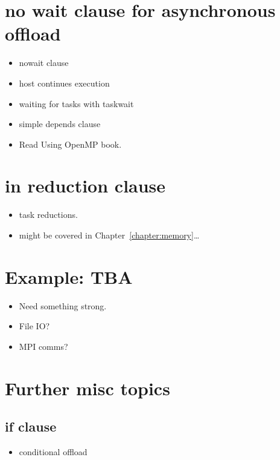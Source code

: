 \section{no wait clause for asynchronous offload}
\begin{itemize}
  \item nowait clause
  \item host continues execution
  \item waiting for tasks with taskwait
  \item simple depends clause
  \item Read Using OpenMP book.
\end{itemize}

\section{in reduction clause}
\label{sec:in_reduction}
\begin{itemize}
  \item task reductions.
  \item might be covered in Chapter~\ref{chapter:memory}\dots
\end{itemize}


\section{Example: TBA}
\begin{itemize}
  \item Need something strong.
  \item File IO?
  \item MPI comms?
\end{itemize}



\section{Further misc topics}
\subsection{if clause}
\label{sec:if_clause}
\begin{itemize}
  \item conditional offload
\end{itemize}

